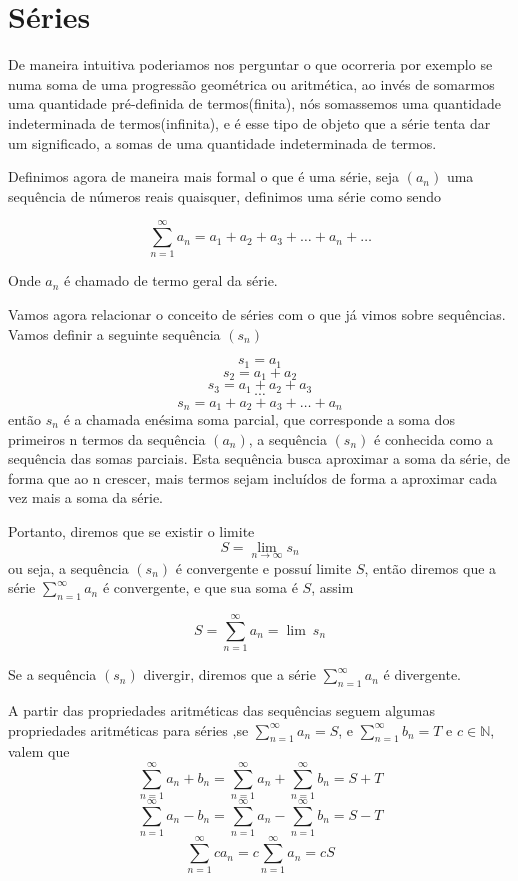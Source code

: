 \section{Séries}
\construirSec

De maneira intuitiva poderiamos nos perguntar o que ocorreria por exemplo se numa 
soma de uma progressão geométrica ou aritmética, ao invés de somarmos uma 
quantidade pré-definida de termos(finita), nós somassemos uma quantidade 
indeterminada de termos(infinita), e é esse tipo de objeto que a série tenta dar
um significado, a somas de uma quantidade indeterminada de termos.

Definimos agora de maneira mais formal o que é uma série, seja $(a_n)$ uma 
sequência de números reais quaisquer, definimos uma série como sendo

$$\sum_{n = 1}^{\infty} a_n = a_1 + a_2 + a_3 + \dots + a_n + \dots $$

Onde $a_n$ é chamado de termo geral da série.

Vamos agora relacionar o conceito de séries com o que já vimos sobre sequências.
Vamos definir a seguinte sequência $(s_n)$

$$ s_1 = a_1$$
$$ s_2 = a_1 + a_2$$
$$ s_3 = a_1 + a_2 + a_3$$
$$\cdots$$
$$ s_n = a_1 + a_2 + a_ 3 + \dots + a_n$$
então $s_n$ é a chamada enésima soma parcial, que corresponde a soma dos primeiros
n termos da sequência $(a_n)$, a sequência $(s_n)$ é conhecida como a sequência 
das somas parciais. Esta sequência busca aproximar a soma da série, de forma que
ao n crescer, mais termos sejam incluídos de forma a aproximar cada vez mais a 
soma da série. 

Portanto, diremos que se existir o limite 
$$ S = \lim_{n \to \infty} s_n$$
ou seja, a sequência $(s_n)$ é convergente e possuí limite $S$, então diremos
que a série $\sum_{n = 1}^{\infty} a_n$ é convergente, e que sua soma é $S$,
assim

$$ S = \sum_{n = 1}^{\infty} a_n = \lim{\:} s_n$$ 

Se a sequência $(s_n)$ divergir, diremos que a série $\sum_{n = 1}^{\infty} a_n$
é divergente.

A partir das propriedades aritméticas das sequências seguem algumas propriedades
aritméticas para séries ,se $\sum_{n = 1}^{\infty} a_n = S$, e
$\sum_{n = 1}^{\infty} b_n = T$ e $c \in \mathbb{N}$, valem que
$$\sum_{n = 1}^{\infty} a_n + b_n= \sum_{n = 1}^{\infty} a_n +\sum_{n = 1}^{\infty} b_n = S + T $$
$$\sum_{n = 1}^{\infty} a_n - b_n= \sum_{n = 1}^{\infty} a_n -\sum_{n = 1}^{\infty} b_n = S - T $$
$$\sum_{n = 1}^{\infty} c a_n = c \sum_{n = 1}^{\infty} a_n = c S$$

